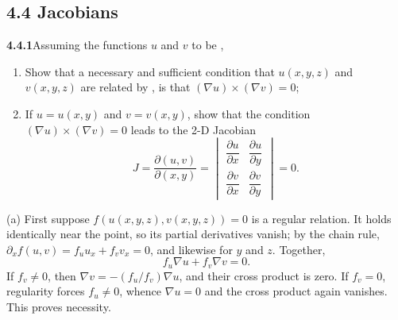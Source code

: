 \subsection*{4.4 Jacobians}

\par\bigskip
\noindent\textbf{4.4.1}\quad Assuming the functions $u$ and $v$ to be
,
\begin{enumerate}
\item[(a)] Show that a necessary and sufficient condition that $u(x,y,z)$ and
  $v(x,y,z)$ are related by , is that
  $(\nabla u)\times(\nabla v)=0$;
\item[(b)] If $u=u(x,y)$ and $v=v(x,y)$, show that the condition
  $(\nabla u)\times(\nabla v)=0$ leads to the 2-D Jacobian
  \[
  J=\frac{\partial(u,v)}{\partial(x,y)}
  =\begin{vmatrix}\dfrac{\partial u}{\partial x}&\dfrac{\partial u}
  {\partial y}\\[2ex]\dfrac{\partial v}{\partial x}&\dfrac{\partial v}
  {\partial y}\end{vmatrix}=0.
  \]
\end{enumerate}
\solution
{}

(a) First suppose $f(u(x,y,z),v(x,y,z))=0$ is a regular relation.
It holds identically near the point, so its partial derivatives vanish;
by the chain rule, $\partial_x f(u,v)=f_uu_x+f_vv_x=0$, and likewise
for $y$ and $z$. Together,
\[
f_u\nabla u+f_v\nabla v=0.
\]
If $f_v\ne0$, then $\nabla v=-(f_u/f_v)\nabla u$, and their cross
product is zero. If $f_v=0$, regularity forces $f_u\ne0$, whence
$\nabla u=0$ and the cross product again vanishes. This proves necessity.

